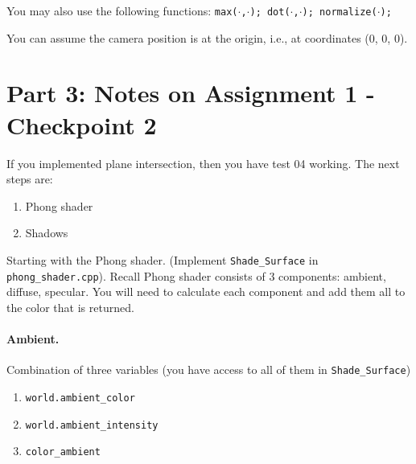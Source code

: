 \documentclass[12pt]{article}
\begin{document}
You may also use the following functions: \texttt{max($\cdot$,$\cdot$); dot($\cdot$,$\cdot$);
normalize($\cdot$);}

You can assume the camera position is at the origin, i.e., at coordinates (0, 0,
0).

\section*{Part 3: Notes on Assignment 1 - Checkpoint 2}

If you implemented plane intersection, then you have test 04 working.  The next
steps are:

\begin{enumerate}
\item Phong shader
\item Shadows
\end{enumerate}

Starting with the Phong shader.  (Implement \texttt{Shade\_Surface} in
\texttt{phong\_shader.cpp}). Recall Phong shader consists of 3 components:
ambient, diffuse, specular. You will need to calculate each component and add
them all to the color that is returned.

\paragraph*{Ambient.} Combination of three variables (you have access to all of
them in \texttt{Shade\_Surface})
\begin{enumerate}
\item \texttt{world.ambient\_color}
\item \texttt{world.ambient\_intensity}
\item \texttt{color\_ambient}
\end{enumerate}
\end{document}
